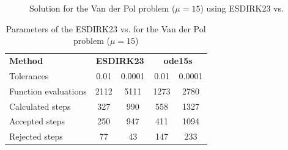 \begin{figure}[H]
    \centering
    \caption{Solution for the Van der Pol problem ($\mathit{\mu = 15}$) using ESDIRK23 vs. }
    \label{8_6_mu_15}
\end{figure}

\begin{table}[H]
    \centering
    \begin{tabular}{@{}l|cc|cc@{}}
    \toprule
    \textbf{Method}      & \multicolumn{2}{c|}{\textbf{ESDIRK23}} & \multicolumn{2}{c}{\textbf{ode15s}} \\
    Tolerances           & 0.01              & 0.0001             & 0.01            & 0.0001           \\ \midrule
    Function evaluations & 2112              & 5111               & 1273            & 2780             \\
    Calculated steps     & 327               & 990                & 558             & 1327             \\
    Accepted steps       & 250               & 947                & 411             & 1094             \\
    Rejected steps       & 77                & 43                 & 147             & 233              \\ \bottomrule
    \end{tabular}
    \caption{Parameters of the ESDIRK23 vs.  for the Van der Pol problem ($\mathit{\mu = 15}$)}
    \label{8_6_adaptive_mu_15_table}
\end{table}

